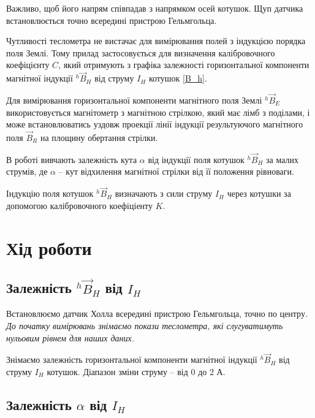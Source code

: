 Важливо, щоб його напрям співпадав з напрямком осей котушок.
Щуп датчика встановлюється точно всередині пристрою Гельмгольца.

Чутливості теслометра не вистачає для вимірювання полей з індукцією порядка поля Землі.
Тому прилад застосовується для визначення калібровочного коефіцієнту $C$, який отримують з графіка залежності горизонтальної компоненти магнітної індукції $ {}^{h}\vec{B}_{H}$ від струму $I_{H}$ котушок \eqref{B_h}.


Для вимірювання горизонтальної компоненти магнітного поля Землі  $ {}^{h}\vec{B}_{E}$
використовується магнітометр з магнітною стрілкою, який має лімб з поділами, і може
встановлюватись уздовж проекції лінії індукції результуючого магнітного поля $\vec{B}_{R}$ на площину обертання
стрілки.

В роботі вивчають залежність кута $\alpha$ від індукції поля котушок $ {}^{h}\vec{B}_{H}$
за малих струмів, де $\alpha$  -- кут відхилення магнітної стрілки від її положення рівноваги.

Індукцію поля котушок  $ {}^{h}\vec{B}_{H} $ визначають з сили струму $I_{H}$ через котушки за допомогою калібровочного коефіціенту $K$.



\section{Хід роботи}

\subsection{Залежність  $ {}^{h}\vec{B}_{H} $ від $I_{H}$}

Встановлюємо датчик Холла всередині пристрою Гельмгольца, точно по центру.
\textit{До початку вимірювань %
знімаємо покази теслометра, які слугуватимуть нульовим рівнем для наших даних.}

Знімаємо залежність горизонтальної компоненти магнітної індукції $ {}^{h}\vec{B}_{H} $ від струму  $I_{H}$ котушок. Діапазон зміни струму -- від 0 до 2 А.

\subsection{Залежність  $\alpha$ від $I_{H}$}

